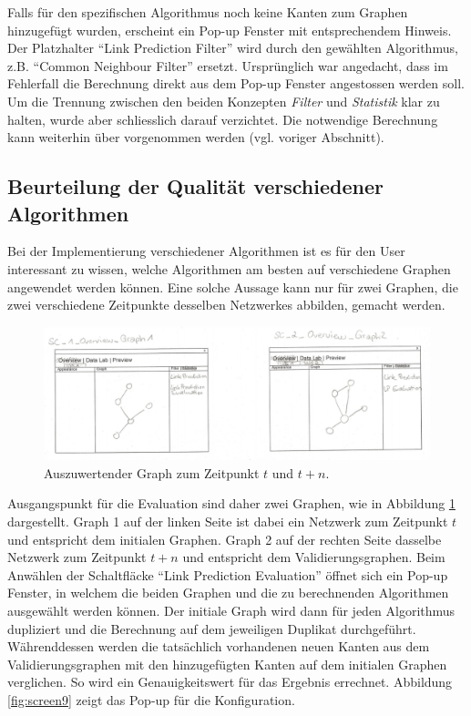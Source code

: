 Falls für den spezifischen Algorithmus noch keine Kanten zum Graphen hinzugefügt wurden, erscheint ein Pop-up Fenster mit entsprechendem Hinweis.
Der Platzhalter ``Link Prediction Filter'' wird durch den gewählten Algorithmus, z.B. ``Common Neighbour Filter'' ersetzt.
Ursprünglich war angedacht, dass im Fehlerfall die Berechnung direkt aus dem Pop-up Fenster angestossen werden soll.
Um die Trennung zwischen den beiden Konzepten \textit{Filter} und \textit{Statistik} klar zu halten, wurde aber schliesslich darauf verzichtet.
Die notwendige Berechnung kann weiterhin über  vorgenommen werden (vgl. voriger Abschnitt).

\subsection{Beurteilung der Qualität verschiedener Algorithmen}

Bei der Implementierung verschiedener Algorithmen ist es für den User interessant zu wissen, welche Algorithmen am
besten auf verschiedene Graphen angewendet werden können. Eine solche Aussage kann nur für zwei Graphen, die zwei
verschiedene Zeitpunkte desselben Netzwerkes abbilden, gemacht werden.

\begin{figure}
    \includegraphics[width=\linewidth]{resources/EV-1.png}
    \caption{Auszuwertender Graph zum Zeitpunkt $t$ und $t + n$.}
    \label{fig:screen8}
\end{figure}

Ausgangspunkt für die Evaluation sind daher zwei Graphen, wie in Abbildung \ref{fig:screen8} dargestellt. Graph 1 auf der linken Seite ist dabei ein Netzwerk zum Zeitpunkt $t$ und entspricht dem initialen Graphen. Graph 2 auf der rechten Seite
dasselbe Netzwerk zum Zeitpunkt $t + n$ und entspricht dem Validierungsgraphen. Beim Anwählen der Schaltfläcke ``Link Prediction Evaluation'' öffnet sich ein Pop-up Fenster, in
welchem die beiden Graphen und die zu berechnenden Algorithmen ausgewählt werden können. Der initiale Graph wird dann für jeden
Algorithmus dupliziert und die Berechnung auf dem jeweiligen Duplikat durchgeführt. Währenddessen werden die tatsächlich
vorhandenen neuen Kanten aus dem Validierungsgraphen mit den hinzugefügten Kanten auf dem initialen Graphen verglichen. So wird ein Genauigkeitswert für
das Ergebnis errechnet. Abbildung \ref{fig:screen9} zeigt das Pop-up für die Konfiguration.

